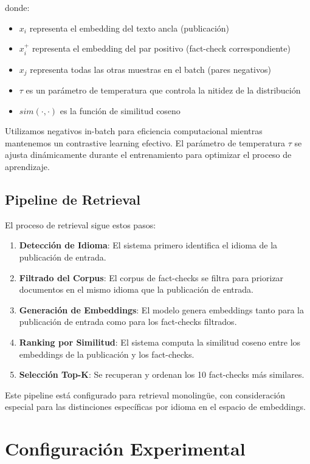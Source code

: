 \documentclass[a4paper,openany]{memoir}
\begin{document}
donde:
\begin{itemize}
    \item $x_i$ representa el embedding del texto ancla (publicación)
    \item $x_i^+$ representa el embedding del par positivo (fact-check correspondiente)
    \item $x_j$ representa todas las otras muestras en el batch (pares negativos)
    \item $\tau$ es un parámetro de temperatura que controla la nitidez de la distribución
    \item $sim(\cdot,\cdot)$ es la función de similitud coseno
\end{itemize}

Utilizamos negativos in-batch para eficiencia computacional mientras mantenemos un contrastive learning efectivo. El parámetro de temperatura $\tau$ se ajusta dinámicamente durante el entrenamiento para optimizar el proceso de aprendizaje.

\section{Pipeline de Retrieval}

El proceso de retrieval sigue estos pasos:
\begin{enumerate}
    \item \textbf{Detección de Idioma}: El sistema primero identifica el idioma de la publicación de entrada.
    \item \textbf{Filtrado del Corpus}: El corpus de fact-checks se filtra para priorizar documentos en el mismo idioma que la publicación de entrada.
    \item \textbf{Generación de Embeddings}: El modelo genera embeddings tanto para la publicación de entrada como para los fact-checks filtrados.
    \item \textbf{Ranking por Similitud}: El sistema computa la similitud coseno entre los embeddings de la publicación y los fact-checks.
    \item \textbf{Selección Top-K}: Se recuperan y ordenan los 10 fact-checks más similares.
\end{enumerate}

Este pipeline está configurado para retrieval monolingüe, con consideración especial para las distinciones específicas por idioma en el espacio de embeddings.

\chapter{Configuración Experimental}
\end{document}
